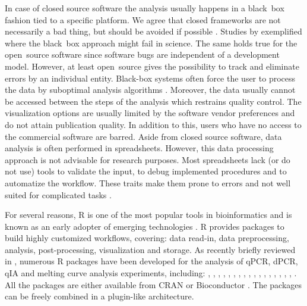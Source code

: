 In case of closed source software the analysis usually happens in a black~box 
fashion tied to a specific platform. We agree that closed frameworks are not 
necessarily a bad thing, but should be avoided if possible 
\citep{roediger_RJ_2013, Spiess_2014}. Studies by \citet{mccullough_2008, 
Almiron_2010, Duran_2014} exemplified where the black~box approach might fail in 
science. The same holds true for the open~source software since software bugs 
are independent of a development model. However, at least open~source gives the 
possibility to track and eliminate errors by an individual entity. Black-box 
systems often force the user to process the data by suboptimal analysis 
algorithms \citep{ruijter_2013}. Moreover, the data usually cannot be accessed 
between the steps of the analysis which restrains quality control. The 
visualization options are usually limited by the software vendor preferences and 
do not attain publication quality. In addition to this, users who have no access 
to the commercial software are barred. Aside from closed source software, data 
analysis is often performed in spreadsheets. However, this data processing 
approach is not advisable for research purposes. Most spreadsheets  lack (or do 
not use) tools to validate the input, to debug implemented procedures and to 
automatize the workflow. These traits make them prone to errors and not well 
suited for complicated tasks \citep{mccullough_2008, burns_2014}.

For several reasons, R is one of the most popular tools in bioinformatics and is 
known as an early adopter of emerging technologies \citep{pabinger_2014}. R 
provides packages to build highly customized workflows, covering: data read-in, 
data preprocessing, analysis, post-processing, visualization and storage. As 
recently briefly reviewed in \citet{pabinger_2014}, numerous R packages have 
been developed for the analysis of qPCR, dPCR, qIA and melting curve analysis 
experiments, including: , , 
, , , , 
, , , , 
, , , , 
, , , 
. All the packages are either available from CRAN or 
Bioconductor \citep{gentleman_2004}. The packages can be freely combined in a 
plugin-like architecture.

